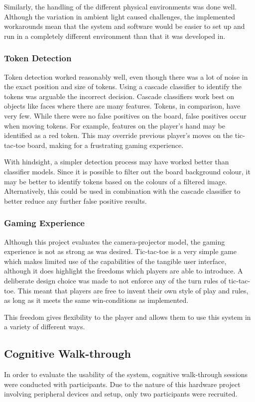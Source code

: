 \documentclass[12pt]{article}
\begin{document}
Similarly, the handling of the different physical environments was done well. 
Although the variation in ambient light caused challenges, the implemented workarounds mean that the system and software would be easier to set up and run in a completely different environment than that it was developed in. 

\subsubsection{Token Detection}
Token detection worked reasonably well, even though there was a lot of noise in the exact position and size of tokens. Using a cascade classifier to identify the tokens was arguable the incorrect decision. 
Cascade classifiers work best on objects like faces where there are many features. Tokens, in comparison, have very few.
While there were no false positives on the board, false positives occur when moving tokens. For example, features on the player's hand may be identified as a red token. 
This may override previous player's moves on the tic-tac-toe board, making for a frustrating gaming experience. 

With hindsight, a simpler detection process may have worked better than classifier models. Since it is possible to filter out the board background colour, it may be better to identify tokens based on the colours of a filtered image. Alternatively, this could be used in combination with the cascade classifier to better reduce any further false positive results. 

\subsubsection{Gaming Experience}
Although this project evaluates the camera-projector model, the gaming experience is not as strong as was desired. 
Tic-tac-toe is a very simple game which makes limited use of the capabilities of the tangible user interface, although it does highlight the freedoms which players are able to introduce. 
A deliberate design choice was made to not enforce any of the turn rules of tic-tac-toe. 
This meant that players are free to invent their own style of play and rules, as long as it meets the same win-conditions as implemented. 

This freedom gives flexibility to the player and allows them to use this system in a variety of different ways. 


\subsection{Cognitive Walk-through}
In order to evaluate the usability of the system, cognitive walk-through sessions were conducted with participants. 
Due to the nature of this hardware project involving peripheral devices and setup, only two participants were recruited. 
\end{document}
